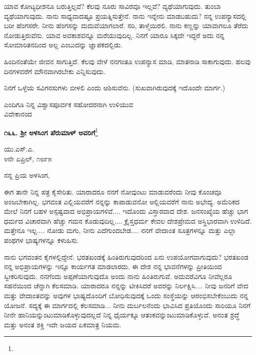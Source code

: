 ಯಾವ ಕೋಟ್ಯಧೀಶನೂ ಬರುತ್ತಿಲ್ಲವೆ? ಕೆಲವು ನೂರು ಸಾವಿರವೂ ಇಲ್ಲವೆ? ವ್ಯಥೆಯಾಗುವುದು. ತುಂಬಾ ವ್ಯಥೆಯಾಗುವುದು. ನಾನು ಸಾಧ್ಯವಾದಷ್ಟೂ ಪ್ರಯತ್ನಿಸುತ್ತೇನೆ. ನಾನು ಇನ್ನೇನು ಮಾಡಬಹುದು? ನನ್ನ ಉಪನ್ಯಾಸದಲ್ಲಿ ಬರೀ ಹೆಂಗಸರೇ. ನೀನು ಹೆಂಗಸನ್ನು ಮದುವೆಯಾಗಲಾರೆ. ಸರಿ, ತಾಳ್ಮೆಯಿರಲಿ. ನಾನು ಕಣ್ಣನ್ನು ಯಾವಾಗಲೂ ತೆರೆದು ನೋಡುತ್ತಿರುವೆನು. ಯಾವ ಅವಕಾಶವನ್ನೂ ಮರೆಯುವುದಿಲ್ಲ. ನಿನಗೆ ಯಾರೂ ಸಿಕ್ಕದೇ ಇದ್ದರೆ ಅದು ನನ್ನ ಸೋಮಾರಿತನದಿಂದ ಅಲ್ಲ ಎಂಬುದನ್ನು ಜ್ಞಾಪಕದಲ್ಲಿಡು.

ಹಿಂದಿನಂತೆಯೇ ಜೀವನ ಸಾಗುತ್ತಿದೆ. ಕೆಲವು ವೇಳೆ ನನಗಂತೂ ಉಪನ್ಯಾಸ ಮಾಡಿ, ಮಾತನಾಡಿ ಸಾಕಾಗುವುದು. ಹಲವು ದಿನಗಳವರೆಗೆ ಮೌನವಾಗಿರಬೇಕು ಎನ್ನಿಸುವುದು.

\eject

ನಿನಗೆ ಒಳ್ಳೆಯ ಸವಿಗನಸುಗಳು ಬೀಳಲಿ ಎಂದು ಆಶಿಸುವೆನು. (ಸುಖವಾಗಿರುವುದಕ್ಕೆ ಇದೊಂದೇ ಮಾರ್ಗ.)

{\flushright
ಎಂದಿಗೂ ನಿನ್ನ ವಿಶ್ವಾಸಪೂರ್ವಕ ಸಹೋದರನಾಗಿ ಉಳಿಯುವ\\ವಿವೇಕಾನಂದ\par}

\begin{center}
\textbf{೧೬೬. ಶ‍್ರೀ ಅಳಸಿಂಗ ಪೆರುಮಾಳ್ ಅವರಿಗೆ}\footnote{}
\end{center}

\begin{flushright}
ಯು.ಎಸ್.ಎ.\\೪ನೇ ಏಪ್ರಿಲ್, ೧೮೯೫
\end{flushright}

\noindent
ನನ್ನ ಪ್ರಿಯ ಅಳಸಿಂಗ,

ಈಗ ತಾನೇ ನಿನ್ನ ಪತ್ರ ಕೈಸೇರಿತು. ಯಾರಾದರೂ ನನಗೆ ನೋವುಂಟು ಮಾಡುವರೆಂದು ನೀವು ಕೊಂಚವೂ ಅಂಜಬೇಕಾಗಿಲ್ಲ. ಭಗವಂತ ಎಲ್ಲಿಯವರೆಗೆ ನನ್ನನ್ನು ಕಾಪಾಡುವನೋ ಅಲ್ಲಿಯವರೆಗೆ ನಾನು ಅಭೇದ್ಯ. ಅಮೆರಿಕದ ಮೇಲೆ ನಿನಗೆ ಬಹಳ ಅಸ್ಪಷ್ಟವಾದ ಅಭಿಪ್ರಾಯಗಳಿವೆ.... ಇದೊಂದು ವಿಸ್ತಾರವಾದ ದೇಶ. ಜನಸಂಖ್ಯೆಯ ಹೆಚ್ಚು ಭಾಗ ಧರ್ಮದ ವಿಚಾರವಾಗಿ ಹೆಚ್ಚು ಗಮನ ಕೊಡುವುದಿಲ್ಲ.... ಕ್ರೈಸ್ತಧರ್ಮ ಕೇವಲ ದೇಶಪ್ರೇಮದ ಅಸ್ಥಿಭಾರವಾಗಿ ಉಳಿದಿದೆ. ಮತ್ತೇನೂ ಇಲ್ಲ.... ನೋಡು ಮಗು, ನೀನು ಎದೆಗುಂದಬೇಡ.... ನನಗೆ ವೇದಾಂತ ಸೂತ್ರಗಳನ್ನೂ ಮತ್ತು ಎಲ್ಲಾ ಪಂಥಗಳ ಭಾಷ್ಯಗಳನ್ನೂ ಕಳುಹಿಸು.

ನಾನು ಭಗವಂತನ ಕೈಗಳಲ್ಲಿದ್ದೇನೆ. ಭರತಖಂಡಕ್ಕೆ ಹಿಂತಿರುಗುವುದರಿಂದ ಏನು ಉಪಯೋಗವಾಗುವುದು? ಭರತಖಂಡ ನನ್ನ ಅಭಿಪ್ರಾಯಗಳನ್ನು ಇನ್ನೂ ಕಾರ್ಯಗತ ಮಾಡಲಾರದು. ಈ ದೇಶ ನನ್ನ ಭಾವನೆಗಳನ್ನು ಪ್ರೀತಿಯಿಂದ ಸ್ವೀಕರಿಸುವುದು. ನನಗೆಂದು ಅಪ್ಪಣೆಯಾಗುವುದೊ ಅಂದು ನಾನು ಹಿಂತಿರುಗುವೆ. ಅದುವರೆವಿಗೂ ನೀವೆಲ್ಲರೂ ಸಹನೆಯಿಂದ ಚೆನ್ನಾಗಿ ಕೆಲಸಮಾಡಿ. ಯಾರಾದರೂ ನನ್ನನ್ನು ಟೀಕಿಸಿದರೆ ಅವರನ್ನು ನಿರ್ಲಕ್ಷಿಸಿ.... ನೀವು ಜನರಿಗೆ ವೇದ ಮತ್ತು ವೇದಾಂತವನ್ನು ಅವುಗಳ ಭಾಷ್ಯದೊಂದಿಗೆ ಬೋಧಿಸುವುದಕ್ಕೆ ಒಂದು ಸಂಸ್ಥೆಯನ್ನು ಆರಂಭಿಸಬೇಕೆಂಬುದು ನನ್ನ ಯೋಜನೆ. ಸದ್ಯಕ್ಕೆ ಈ ಮಾರ್ಗದಲ್ಲಿ ಕೆಲಸಮಾಡಿ... ನೀನು ದುರ್ಬಲನೆಂದು ಭಾವಿಸಿದ ಪ್ರತಿಯೊಂದು ಸಾರಿಯೂ ನಿನಗೆ ನೀನೇ ಹಾನಿಯನ್ನುಂಟುಮಾಡಿಕೊಳ್ಳುವುದಲ್ಲದೆ ನಿನ್ನ ಧೈರ್ಯಕ್ಕೂ ಆತಂಕವನ್ನುಂಟುಮಾಡಿಕೊಳ್ಳುವೆ. ಅನಂತ ಶ್ರದ್ಧೆ ಮತ್ತು ಅನಂತ ಶಕ್ತಿ ಇವೇ ಜಯದ ಏಕಮಾತ್ರ ನಿಯಮ.

